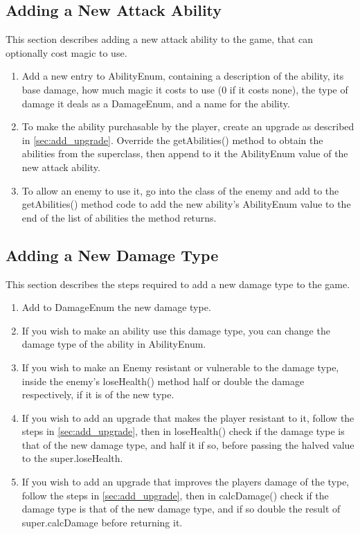 \documentclass[11pt]{article}
\begin{document}
\subsection{Adding a New Attack Ability}
This section describes adding a new attack ability to the game, that can optionally cost magic to use.

\begin{enumerate}
  \item Add a new entry to AbilityEnum, containing a description of the ability, its base damage, how much magic it costs to use (0 if it costs none), the type of damage it deals as a DamageEnum, and a name for the ability.
  \item To make the ability purchasable by the player, create an upgrade as described in \ref{sec:add_upgrade}. Override the getAbilities() method to obtain the abilities from the superclass, then append to it the AbilityEnum value of the new attack ability.
  \item To allow an enemy to use it, go into the class of the enemy and add to the getAbilities() method code to add the new ability's AbilityEnum value to the end of the list of abilities the method returns. 
\end{enumerate}
\subsection{Adding a New Damage Type}
This section describes the steps required to add a new damage type to the game.

\begin{enumerate}
  \item Add to DamageEnum the new damage type.
  \item If you wish to make an ability use this damage type, you can change the damage type of the ability in AbilityEnum.
  \item If you wish to make an Enemy resistant or vulnerable to the damage type, inside the enemy's loseHealth() method half or double the damage respectively, if it is of the new type. 
  \item If you wish to add an upgrade that makes the player resistant to it, follow the steps in \ref{sec:add_upgrade}, then in loseHealth() check if the damage type is that of the new damage type, and half it if so, before passing the halved value to the super.loseHealth.
  \item If you wish to add an upgrade that improves the players damage of the type, follow the steps in \ref{sec:add_upgrade}, then in calcDamage() check if the damage type is that of the new damage type, and if so double the result of super.calcDamage before returning it.  
\end{enumerate}
\end{document}
